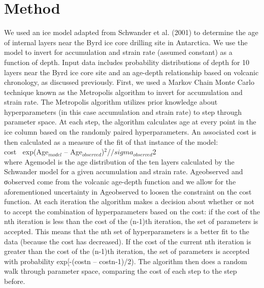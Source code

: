 \documentclass[draft,jgrga]{agutex}
\begin{document}
\section{Method}\label{method}


We used an ice model adapted from Schwander et al. (2001) to determine the age of internal layers near the Byrd ice core drilling site in Antarctica. We use the model to invert for accumulation and strain rate (assumed constant) as a function of depth.  Input data includes probability distributions of depth for 10 layers near the Byrd ice core site and an age-depth relationship based on volcanic chronology, as discussed previously.
	First, we used a Markov Chain Monte Carlo technique known as the Metropolis algorithm to invert for accumulation and strain rate. The Metropolis algorithm utilizes prior knowledge about hyperparameters (in this case accumulation and strain rate) to step through parameter space. At each step, the algorithm calculates age at every point in the ice column based on the randomly paired hyperparameters.  An associated cost is then calculated  as a measure of the fit of that instance of the model:
\\
cost $~$ exp(Age$_{model}$ – Age$_{observed}$)$^2$/$/sigma_{observed}$2
\\
where Agemodel is the age distribution of the ten layers calculated by the Schwander model for a given accumulation and strain rate. Ageobserved and σobserved come from the volcanic age-depth function and we allow for the aforementioned uncertainty in Ageobserved to loosen the constraint on the cost function. At each iteration the algorithm makes a decision about whether or not to accept the combination of hyperparameters based on the cost: if the cost of the nth iteration is less than the cost of the (n-1)th iteration, the set of parameters is accepted. This means that the nth set of hyperparameters is a better fit to the data (because the cost has decreased). If the cost of the current nth iteration is greater than the cost of the (n-1)th iteration, the set of parameters is accepted with probability exp[-(costn – costn-1)/2). The algorithm then does a random walk through parameter space, comparing the cost of each step to the step before.
\end{document}
